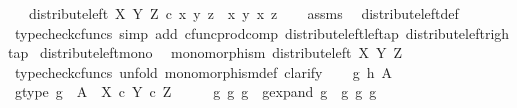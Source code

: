 \begin{isabellebody}
\ \ \ {\isachardoublequoteopen}distribute{\isacharunderscore}{\kern0pt}left\ X\ Y\ Z\ {\isasymcirc}\isactrlsub c\ {\isasymlangle}x{\isacharcomma}{\kern0pt}\ {\isasymlangle}y{\isacharcomma}{\kern0pt}\ z{\isasymrangle}{\isasymrangle}\ {\isacharequal}{\kern0pt}\ {\isasymlangle}{\isasymlangle}x{\isacharcomma}{\kern0pt}\ y{\isasymrangle}{\isacharcomma}{\kern0pt}\ {\isasymlangle}x{\isacharcomma}{\kern0pt}\ z{\isasymrangle}{\isasymrangle}{\isachardoublequoteclose}\isanewline
%
\isadelimproof
\ \ %
\endisadelimproof
%
\isatagproof
{}\isamarkupfalse%
\ assms\ \isamarkupfalse%
\ distribute{\isacharunderscore}{\kern0pt}left{\isacharunderscore}{\kern0pt}def\ \isanewline
\ \ \isamarkupfalse%
\ {\isacharparenleft}{\kern0pt}typecheck{\isacharunderscore}{\kern0pt}cfuncs{\isacharcomma}{\kern0pt}\ simp\ add{\isacharcolon}{\kern0pt}\ cfunc{\isacharunderscore}{\kern0pt}prod{\isacharunderscore}{\kern0pt}comp\ distribute{\isacharunderscore}{\kern0pt}left{\isacharunderscore}{\kern0pt}left{\isacharunderscore}{\kern0pt}ap\ distribute{\isacharunderscore}{\kern0pt}left{\isacharunderscore}{\kern0pt}right{\isacharunderscore}{\kern0pt}ap{\isacharparenright}{\kern0pt}%
\endisatagproof
{\isafoldproof}%
%
\isadelimproof
\isanewline
%
\endisadelimproof
\isanewline
{}\isamarkupfalse%
\ distribute{\isacharunderscore}{\kern0pt}left{\isacharunderscore}{\kern0pt}mono{\isacharcolon}{\kern0pt}\isanewline
\ \ {\isachardoublequoteopen}monomorphism\ {\isacharparenleft}{\kern0pt}distribute{\isacharunderscore}{\kern0pt}left\ X\ Y\ Z{\isacharparenright}{\kern0pt}{\isachardoublequoteclose}\isanewline
%
\isadelimproof
%
\endisadelimproof
%
\isatagproof
{}\isamarkupfalse%
\ {\isacharparenleft}{\kern0pt}typecheck{\isacharunderscore}{\kern0pt}cfuncs{\isacharcomma}{\kern0pt}\ unfold\ monomorphism{\isacharunderscore}{\kern0pt}def{}{\isacharcomma}{\kern0pt}\ clarify{\isacharparenright}{\kern0pt}\isanewline
\ \ \isamarkupfalse%
\ g\ h\ A\isanewline
\ \ \isamarkupfalse%
\ g{\isacharunderscore}{\kern0pt}type{\isacharcolon}{\kern0pt}\ {\isachardoublequoteopen}g\ {\isacharcolon}{\kern0pt}\ A\ {\isasymrightarrow}\ X\ {\isasymtimes}\isactrlsub c\ {\isacharparenleft}{\kern0pt}Y\ {\isasymtimes}\isactrlsub c\ Z{\isacharparenright}{\kern0pt}{\isachardoublequoteclose}\isanewline
\ \ \isamarkupfalse%
\ \isamarkupfalse%
\ g{}\ g{}\ g{}\ \ g{\isacharunderscore}{\kern0pt}expand{\isacharcolon}{\kern0pt}\ {\isachardoublequoteopen}g\ {\isacharequal}{\kern0pt}\ {\isasymlangle}g{}{\isacharcomma}{\kern0pt}\ {\isasymlangle}g{}{\isacharcomma}{\kern0pt}\ g{}{\isasymrangle}{\isasymrangle}{\isachardoublequoteclose}\isanewline

\end{isabellebody}
